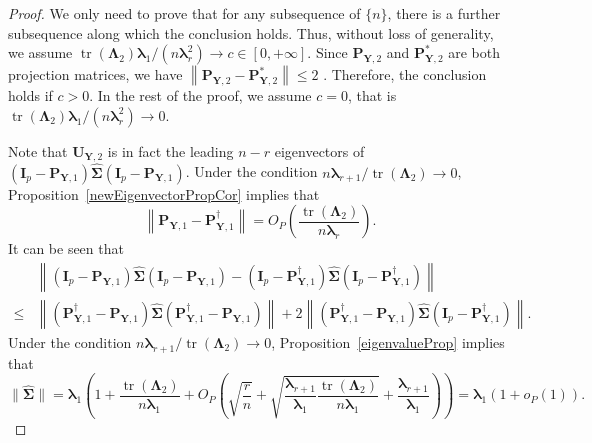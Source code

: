 \documentclass[10pt]{book}
\theoremstyle{definition}
\DeclareMathOperator{\mytr}{tr}
\newcommand{\bP}{\mathbf{P}}
\newcommand{\bY}{\mathbf{Y}}
\newcommand{\bI}{\mathbf{I}}
\newcommand{\bU}{\mathbf{U}}
\newcommand{\bfsym}[1]{\ensuremath{\boldsymbol{#1}}}
\def\blambda {\bfsym {\lambda}}
\def\bLambda {\bfsym {\Lambda}}
\def\bSigma {\bfsym {\Sigma}}
\begin{document}
\begin{proof}
    We only need to prove that for any subsequence of $\{n\}$, there is a further subsequence along which the conclusion holds.
    Thus, without loss of generality, we assume $\mytr(\bLambda_2)\blambda_1 /{(n \blambda_r^2)}\to c\in [0,+\infty]$.
    Since $
    \bP_{\bY,2}
    $ and 
    $
    \bP_{\bY,2}^*
            $
            are both projection matrices, we have
            $
            \left\|
    \bP_{\bY,2}
    -
            \bP_{\bY,2}^*
            \right\|
            \leq 2
            $
    .
    Therefore, the conclusion holds if $c>0$.
    In the rest of the proof, we assume $c=0$, that is $\mytr(\bLambda_2)\blambda_1 /{(n \blambda_r^2)}\to 0$.


    Note that $\bU_{\bY,2}$ is in fact the leading $n-r$ eigenvectors of $(\bI_p -\bP_{\bY,1})\hat{\bSigma}(\bI_p -\bP_{\bY,1})$.
    Under the condition $n\blambda_{r+1}/\mytr(\bLambda_2)\to 0$,
    Proposition~\ref{newEigenvectorPropCor} implies that 
    \begin{equation*}
        \left\|
        \bP_{\bY,1}
        - 
\bP^\dagger_{\bY,1}
        \right\|
    =O_P\left(\frac{\mytr(\bLambda_2)}{n\blambda_r}\right).
    \end{equation*}
    It can be seen that
    \begin{equation*}
        \begin{split}
             &
             \left\|(\bI_p -\bP_{\bY,1})\hat{\bSigma}(\bI_p -\bP_{\bY,1})
             -
             (\bI_p -\bP^\dagger_{\bY,1})\hat{\bSigma}(\bI_p-\bP^\dagger_{\bY,1})
             \right\|
             \\
             \leq&
             \left\|
             (\bP^\dagger_{\bY,1}-\bP_{\bY,1})\hat{\bSigma}(\bP^\dagger_{\bY,1}-\bP_{\bY,1})
             \right\|
             +
             2\left\|
             (\bP^\dagger_{\bY,1}-\bP_{\bY,1})\hat{\bSigma}(\bI_p-\bP^\dagger_{\bY,1})
             \right\|
             .
        \end{split}
    \end{equation*}
    Under the condition $n\blambda_{r+1}/\mytr(\bLambda_2)\to 0$, Proposition~\ref{eigenvalueProp} implies that
    \begin{equation*}
        \|\hat{\bSigma}\|
        =\blambda_1\left(
            1+\frac{\mytr(\bLambda_2)}{n\blambda_1}+O_P\left(\sqrt{\frac{r}{n}}+\sqrt{\frac{\blambda_{r+1}}{\blambda_1}\frac{\mytr(\bLambda_2)}{n\blambda_1}}+\frac{\blambda_{r+1}}{\blambda_1}\right)
        \right)
        =\blambda_1(1+o_P(1)).

\end{equation*}
\end{proof}
\end{document}
